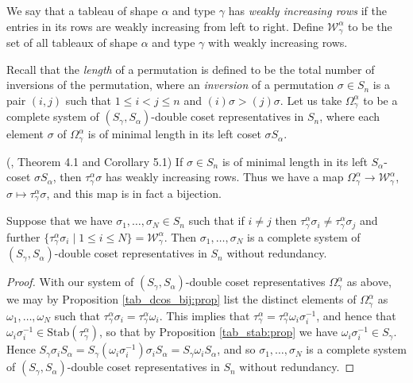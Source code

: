 We say that a tableau of shape $\alpha$ and type $\gamma$ has \textit{weakly increasing rows} if the entries in its rows are weakly
increasing from left to right. Define $\mathcal{W}^\alpha_{\gamma}$ to be the set of all tableaux of shape $\alpha$ and type
$\gamma$ with weakly increasing rows.

Recall that the \textit{length} of a permutation is defined to be the total number of inversions of the permutation, where an
\textit{inversion} of a permutation $\sigma \in S_n$ is a pair $(i,j)$ such that $1 \leq i < j \leq n$ and $(i)\sigma > (j)\sigma$.
Let us take $\Omega^\alpha_{\gamma}$ to be a complete system of $(S_\gamma,S_\alpha)$-double coset representatives in $S_n$, where each element
$\sigma$ of $\Omega^\alpha_\gamma$ is of minimal length in its left coset $\sigma S_\alpha$.

\begin{prop}\label{tab_dcos_bij:prop}\textup{(}\cite{WLDDCR}, Theorem 4.1 and Corollary 5.1\textup{)}
If $\sigma \in S_n$ is of minimal length in its left $S_\alpha$-coset $\sigma S_\alpha$, then $\tau^\alpha_{\gamma}\sigma$ has
weakly increasing rows. Thus we have a map
$\Omega^\alpha_\gamma \longrightarrow \mathcal{W}^\alpha_\gamma$, $\sigma \longmapsto \tau^\alpha_\gamma\sigma$, and this map is in fact a
bijection.
\end{prop}

\begin{coro}\label{tabs_give_cosets:cor}
Suppose that we have $\sigma_1,\ldots,\sigma_N \in S_n$ such that if $i \neq j$ then
$\tau^\alpha_\gamma\sigma_i \neq \tau^\alpha_\gamma\sigma_j$ and further $\{\tau^\alpha_\gamma\sigma_i \mid 1 \leqslant i \leqslant N\} =
\mathcal{W}^\alpha_\gamma$. Then $\sigma_1,\ldots,\sigma_N$ is a complete system of $(S_\gamma,S_\alpha)$-double coset representatives in
$S_n$ without redundancy.
\end{coro}
\begin{proof}
With our system of $(S_\gamma,S_\alpha)$-double coset representatives $\Omega^\alpha_{\gamma}$ as above, we may by Proposition
\ref{tab_dcos_bij:prop} list the distinct elements of $\Omega^\alpha_{\gamma}$ as $\omega_1,\ldots,\omega_N$ such that
$\tau^\alpha_\gamma\sigma_i = \tau^\alpha_\gamma\omega_i$. This implies that $\tau^\alpha_\gamma = \tau^\alpha_\gamma\omega_i\sigma_i^{-1}$, and
hence that $\omega_i\sigma_i^{-1} \in \mathrm{Stab}(\tau^\alpha_\gamma)$, so that by Proposition \ref{tab_stab:prop} we have
$\omega_i\sigma_i^{-1} \in S_\gamma$. Hence $S_\gamma \sigma_i S_\alpha = S_\gamma (\omega_i\sigma_i^{-1}) \sigma_i S_\alpha =
S_\gamma \omega_i S_\alpha$, and so $\sigma_1,\ldots,\sigma_N$ is a complete system of $(S_\gamma,S_\alpha)$-double coset representatives in
$S_n$ without redundancy.
\end{proof}
